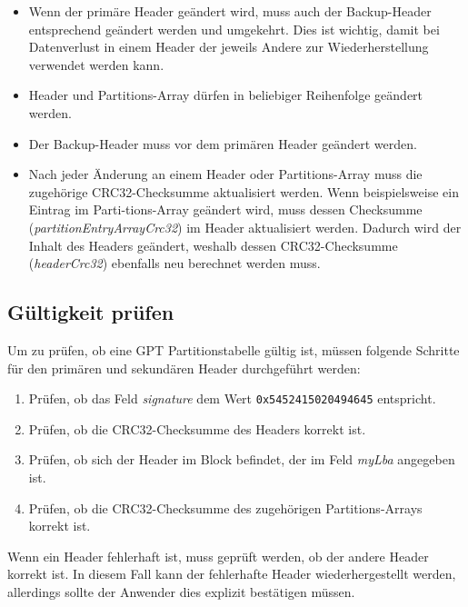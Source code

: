 \begin{itemize}
    \item Wenn der primäre Header geändert wird, muss auch der Backup-Header entsprechend geändert werden und umgekehrt.
    Dies ist wichtig, damit bei Datenverlust in einem Header der jeweils Andere zur Wiederherstellung verwendet werden kann.

    \item Header und Partitions-Array dürfen in beliebiger Reihenfolge geändert werden.
    
    \item Der Backup-Header muss vor dem primären Header geändert werden.

    \item Nach jeder Änderung an einem Header oder Partitions-Array muss die zugehörige CRC32-Checksumme aktualisiert werden.
    Wenn beispielsweise ein Eintrag im Parti-tions-Array geändert wird, muss dessen Checksumme (\textit{partitionEntryArrayCrc32}) im Header aktualisiert werden.
    Dadurch wird der Inhalt des Headers geändert, weshalb dessen CRC32-Checksumme (\textit{headerCrc32}) ebenfalls neu berechnet werden muss.
\end{itemize}

\subsection{Gültigkeit prüfen}
Um zu prüfen, ob eine GPT Partitionstabelle gültig ist, müssen folgende Schritte für den primären und sekundären Header durchgeführt werden:

\newpage
\begin{enumerate}
    \item Prüfen, ob das Feld \textit{signature} dem Wert \texttt{0x5452415020494645} entspricht.
    \item Prüfen, ob die CRC32-Checksumme des Headers korrekt ist.
    \item Prüfen, ob sich der Header im Block befindet, der im Feld \textit{myLba} angegeben ist.
    \item Prüfen, ob die CRC32-Checksumme des zugehörigen Partitions-Arrays korrekt ist.
\end{enumerate}

Wenn ein Header fehlerhaft ist, muss geprüft werden, ob der andere Header korrekt ist.
In diesem Fall kann der fehlerhafte Header wiederhergestellt werden, allerdings sollte der Anwender dies explizit bestätigen müssen.\cite{uefi-spec}

